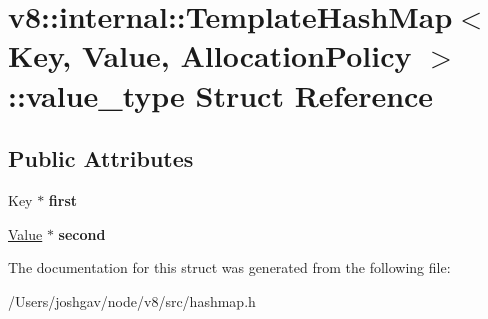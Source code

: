 \hypertarget{structv8_1_1internal_1_1_template_hash_map_1_1value__type}{}\section{v8\+:\+:internal\+:\+:Template\+Hash\+Map$<$ Key, Value, Allocation\+Policy $>$\+:\+:value\+\_\+type Struct Reference}
\label{structv8_1_1internal_1_1_template_hash_map_1_1value__type}
\subsection*{Public Attributes}
\begin{DoxyCompactItemize}
\item 
Key $\ast$ {\bfseries first}\hypertarget{structv8_1_1internal_1_1_template_hash_map_1_1value__type_a9d5aa42edfb80e2f406f97288c696485}{}\label{structv8_1_1internal_1_1_template_hash_map_1_1value__type_a9d5aa42edfb80e2f406f97288c696485}

\item 
\hyperlink{classv8_1_1_value}{Value} $\ast$ {\bfseries second}\hypertarget{structv8_1_1internal_1_1_template_hash_map_1_1value__type_af9c5556de500f8c903f1c22909390728}{}\label{structv8_1_1internal_1_1_template_hash_map_1_1value__type_af9c5556de500f8c903f1c22909390728}

\end{DoxyCompactItemize}


The documentation for this struct was generated from the following file\+:\begin{DoxyCompactItemize}
\item 
/\+Users/joshgav/node/v8/src/hashmap.\+h\end{DoxyCompactItemize}
